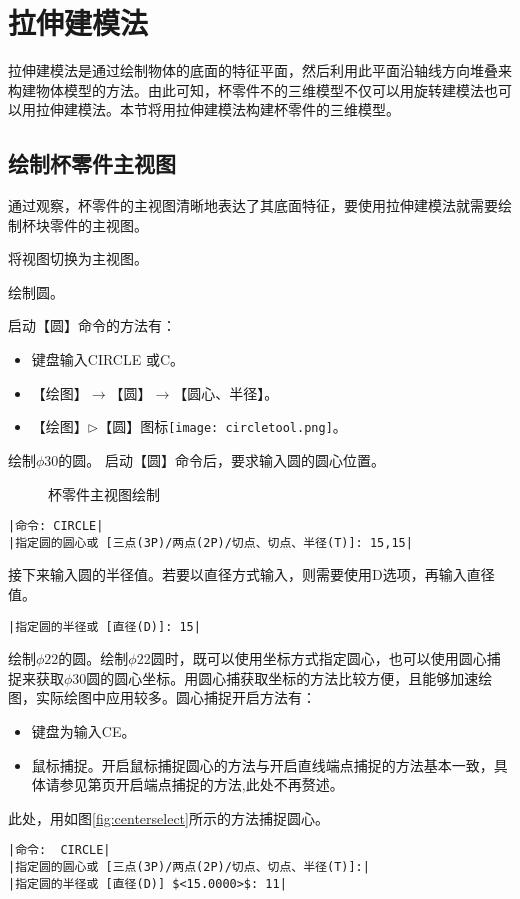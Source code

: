 \section{拉伸建模法}
拉伸建模法是通过绘制物体的底面的特征平面，然后利用此平面沿轴线方向堆叠来构建物体模型的方法。由此可知，杯零件不的三维模型不仅可以用旋转建模法也可以用拉伸建模法。本节将用拉伸建模法构建杯零件的三维模型。
\subsection{绘制杯零件主视图}
通过观察，杯零件的主视图清晰地表达了其底面特征，要使用拉伸建模法就需要绘制杯块零件的主视图。
\begin{procedure}
\item 将视图切换为主视图。
\item 绘制圆。

启动【圆】命令的方法有：
\begin{itemize}
\item 键盘输入CIRCLE 或C。
\item 【绘图】$\rightarrow$【圆】$\rightarrow$【圆心、半径】。
\item 【绘图】$\triangleright$【圆】图标\texttt{[image: circletool.png]}。
\end{itemize}

绘制$\phi 30$的圆。
启动【圆】命令后，要求输入圆的圆心位置。
\begin{figure}[htbp]
\centering
{}\hspace{20pt}
\caption{杯零件主视图绘制}
\end{figure}
\begin{lstlisting}
|命令: CIRCLE|
|指定圆的圆心或 [三点(3P)/两点(2P)/切点、切点、半径(T)]: 15,15|
\end{lstlisting}
接下来输入圆的半径值。若要以直径方式输入，则需要使用D选项，再输入直径值。
\begin{lstlisting}
|指定圆的半径或 [直径(D)]: 15|
\end{lstlisting}
绘制$\phi 22$的圆。绘制$\phi 22$圆时，既可以使用坐标方式指定圆心，也可以使用圆心捕捉来获取$\phi 30$圆的圆心坐标。用圆心捕获取坐标的方法比较方便，且能够加速绘图，实际绘图中应用较多。圆心捕捉开启方法有：
\begin{itemize}
\item 键盘为输入CE。
\item 鼠标捕捉。开启鼠标捕捉圆心的方法与开启直线端点捕捉的方法基本一致，具体请参见第\pageref{fig:duixiangbuzuomen2}页开启端点捕捉的方法,此处不再赘述。
\end{itemize}
 此处，用如图\ref{fig:centerselect}所示的方法捕捉圆心。
\begin{lstlisting}
|命令:  CIRCLE|
|指定圆的圆心或 [三点(3P)/两点(2P)/切点、切点、半径(T)]:|
|指定圆的半径或 [直径(D)] $<15.0000>$: 11|
\end{lstlisting}

\end{procedure}

\endinput